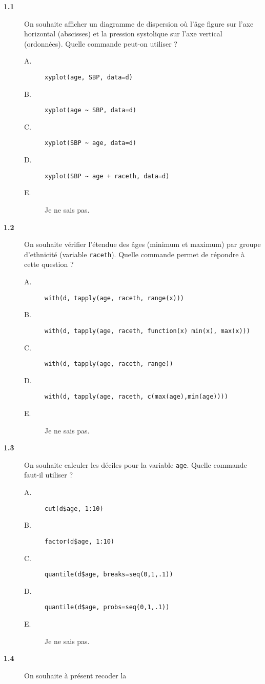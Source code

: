 \documentclass[11pt]{report}
\theoremstyle{definition}
\begin{document}
\begin{description}
\item[\bf 1.1]  On souhaite afficher un diagramme
  de dispersion où l'âge figure sur l'axe horizontal (abscisses) et la
  pression systolique sur l'axe vertical (ordonnées). Quelle commande
  peut-on utiliser ?
  \begin{description}
  \item[A.] \verb|xyplot(age, SBP, data=d)|
  \item[B.] \verb|xyplot(age ~ SBP, data=d)|
  \item[C.] \verb|xyplot(SBP ~ age, data=d)|
  \item[D.] \verb|xyplot(SBP ~ age + raceth, data=d)|
  \item[E.] Je ne sais pas.
  \end{description}
\item[\bf 1.2]  On souhaite vérifier l'étendue des
  âges (minimum et maximum) par groupe d'ethnicité (variable
  \texttt{raceth}). Quelle commande permet de répondre à cette question ?
  \begin{description}
  \item[A.] \verb|with(d, tapply(age, raceth, range(x)))|
  \item[B.] \verb|with(d, tapply(age, raceth, function(x) min(x), max(x)))|
  \item[C.] \verb|with(d, tapply(age, raceth, range))|
  \item[D.] \verb|with(d, tapply(age, raceth, c(max(age),min(age))))|
  \item[E.] Je ne sais pas.
  \end{description}
\item[\bf 1.3]  On souhaite calculer les déciles
  pour la variable \texttt{age}. Quelle commande faut-il utiliser ?
  \begin{description}
  \item[A.] \verb|cut(d$age, 1:10)|
  \item[B.] \verb|factor(d$age, 1:10)|
  \item[C.] \verb|quantile(d$age, breaks=seq(0,1,.1))|
  \item[D.] \verb|quantile(d$age, probs=seq(0,1,.1))|
  \item[E.] Je ne sais pas.
  \end{description}  
\item[\bf 1.4]  On souhaite à présent recoder la

\end{description}
\end{document}
